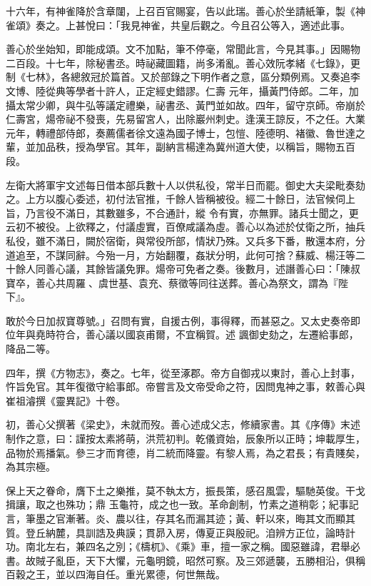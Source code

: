 \begin{pinyinscope}
 十六年，有神雀降於含章闥，上召百官賜宴，告以此瑞。善心於坐請紙筆，製《神雀頌》奏之。上甚悅曰：「我見神雀，共皇后觀之。今且召公等入，適述此事。



 善心於坐始知，即能成頌。文不加點，筆不停毫，常聞此言，今見其事。」因賜物二百段。十七年，除秘書丞。時祕藏圖籍，尚多淆亂。善心效阮孝緒《七錄》，更制《七林》，各總敘冠於篇首。又於部錄之下明作者之意，區分類例焉。又奏追李文博、陸從典等學者十許人，正定經史錯謬。仁壽
 元年，攝黃門侍郎。二年，加攝太常少卿，與牛弘等議定禮樂，祕書丞、黃門並如故。四年，留守京師。帝崩於仁壽宮，煬帝祕不發喪，先易留宮人，出除巖州刺史。逢漢王諒反，不之任。大業元年，轉禮部侍郎，奏薦儒者徐文遠為國子博士，包愷、陸德明、褚徽、魯世達之輩，並加品秩，授為學官。其年，副納言楊達為冀州道大使，以稱旨，賜物五百段。



 左衛大將軍宇文述每日借本部兵數十人以供私役，常半日而罷。御史大夫梁毗奏劾之。上方以腹心委述，初付法官推，千餘人皆稱被役。經二十餘日，法官候伺上旨，乃言役不滿日，其數雖多，不合通計，縱
 令有實，亦無罪。諸兵士聞之，更云初不被役。上欲釋之，付議虛實，百僚咸議為虛。善心以為述於仗衛之所，抽兵私役，雖不滿日，闕於宿衛，與常役所部，情狀乃殊。又兵多下番，散還本府，分道追至，不謀同辭。今殆一月，方始翻覆，姦狀分明，此何可捨？蘇威、楊汪等二十餘人同善心議，其餘皆議免罪。煬帝可免者之奏。後數月，述譖善心曰：「陳叔寶卒，善心共周羅、虞世基、袁充、蔡徵等同往送葬。善心為祭文，謂為『陛下』。



 敢於今日加叔寶尊號。」召問有實，自援古例，事得釋，而甚惡之。又太史奏帝即位年與堯時符合，善心議以國哀甫爾，不宜稱賀。述
 諷御史劾之，左遷給事郎，降品二等。



 四年，撰《方物志》，奏之。七年，從至涿郡。帝方自御戎以東討，善心上封事，忤旨免官。其年復徵守給事郎。帝嘗言及文帝受命之符，因問鬼神之事，敕善心與崔祖濬撰《靈異記》十卷。



 初，善心父撰著《梁史》，未就而歿。善心述成父志，修續家書。其《序傳》末述制作之意，曰：謹按太素將萌，洪荒初判。乾儀資始，辰象所以正時；坤載厚生，品物於焉播氣。參三才而育德，肖二統而降靈。有黎人焉，為之君長；有貴賤矣，為其宗極。



 保上天之眷命，膺下土之樂推，莫不執太方，振長策，感召風雲，驅馳英俊。干戈揖讓，取之也殊功；鼎
 玉龜符，成之也一致。革命創制，竹素之道稍彰；紀事記言，筆墨之官漸著。炎、農以往，存其名而漏其迹；黃、軒以來，晦其文而顯其質。登丘納麓，具訓誥及典謨；貫昴入房，傳夏正與殷祀。洎辨方正位，論時計功。南北左右，兼四名之別；《檮杌》、《乘》車，擅一家之稱。國惡雖諱，君舉必書。故賊子亂臣，天下大懼，元龜明鏡，昭然可察。及三郊遞襲，五勝相沿，俱稱百穀之王，並以四海自任。重光累德，何世無哉。




\end{pinyinscope}
